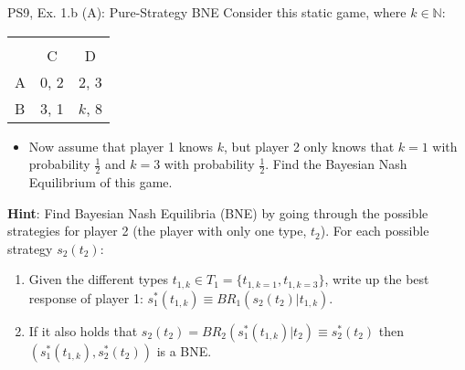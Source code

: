 \begin{frame}{PS9, Ex. 1.b (A): Pure-Strategy BNE}
    Consider this static game, where $k\in\mathbb{N}:$
    \vspace{-16pt}
    \begin{table}
      \begin{tabular}{l|c|c|}
        \multicolumn{1}{c}{} & \multicolumn{2}{c}{} \\
        \multicolumn{1}{c}{} & \multicolumn{1}{c}{C} & \multicolumn{1}{c}{D} \\\cline{2-3}
        A & 0, 2 & 2, 3 \\\cline{2-3}
        B & 3, 1 & $k$, 8 \\\cline{2-3}
      \end{tabular}
    \end{table}
    \vspace{-4pt}
    \begin{itemize}
      \item[(b)] Now assume that player 1 knows $k$, but player 2 only knows that $k = 1$ with probability $\frac{1}{2}$ and $k = 3$ with probability $\frac{1}{2}$. Find the Bayesian Nash Equilibrium of this game.
    \end{itemize}
    \vspace{-4pt}
    \begin{multicols}{2}
      \textbf{Hint}: Find Bayesian Nash Equilibria (BNE) by going through the possible strategies for player 2 (the player with only one type, $t_2$). For each possible strategy $s_2(t_2)$:
      \vspace{-4pt}
      \begin{enumerate}\normalsize
        \item[Step 1:] Given the different types $t_{1,k}\in T_1=\{t_{1,k=1},t_{1,k=3}\}$, write up the best response of player 1: $s_1^*(t_{1,k})\equiv BR_1\left(s_2(t_2)|t_{1,k}\right)$.
        \item[Step 2:] If it also holds that $s_2(t_2)=BR_2\left(s_1^*(t_{1,k})|t_2\right)\equiv s_2^*(t_2)$ then $\left(s_1^*(t_{1,k}),s_2^*(t_2)\right)$ is a BNE.
      \end{enumerate}
      \vfill\null\columnbreak
      \vfill\null
    \end{multicols}
\end{frame}
